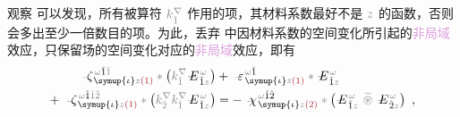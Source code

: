 观察  可以发现，所有被算符 $\mathcolor{gray}{k^\nabla_{\check{1}}}$ 作用的项，其材料系数最好不是 $\mathcolor{gray}{z}$ 的函数，否则会多出至少一倍数目的项。为此，丢弃  中因材料系数的空间变化所引起的\textcolor{Plum}{非局域}效应，只保留场的空间变化对应的\textcolor{Plum}{非局域}效应，即有
\begin{subequations}
	\abovedisplayskip=-8pt
\begin{align}
	\Xint{\begin{smallmatrix} ~ \\ {}^{}_{\mathcolor{gray}{-}} \\ ~ \end{smallmatrix}}{12}{\zeta}^{\;\! \mathcolor{gray}{\omega} \hat{1} \mathcolor{gray}{\check{1}}}_{\;\! \symup{\iota} \mathcolor{gray}{z} \textcolor{Maroon}{(1)}} \mathcolor{gray}{*} \left( \mathcolor{gray}{k^\nabla_{\check{1}}} \Xint{\mathcolor{gray}{-}}{295}{E}^{\;\!\mathcolor{gray}{\omega}}_{\;\! \hat{1} \mathcolor{gray}{z}} \right) &+ \Xint{\begin{smallmatrix} ~ \\ {}^{}_{\mathcolor{gray}{-}} \\ ~ \end{smallmatrix}}{16}{\varepsilon}^{\;\! \mathcolor{gray}{\omega} \hat{1}}_{\;\! \symup{\iota} \mathcolor{gray}{z} \textcolor{Maroon}{(1)}} \mathcolor{gray}{*} \Xint{\mathcolor{gray}{-}}{295}{E}^{\;\!\mathcolor{gray}{\omega}}_{\;\! \hat{1} \mathcolor{gray}{z}}  \label{eq:nonlinear(2)-wave_wkrho-simplify3} \\ 
	+~ \Xint{\begin{smallmatrix} ~ \\ {}^{}_{\mathcolor{gray}{-}} \\ ~ \end{smallmatrix}}{12}{\zeta}^{\;\! \mathcolor{gray}{\omega} \hat{1} \mathcolor{gray}{\check{1} \check{2}}}_{\;\! \symup{\iota} \mathcolor{gray}{z} \textcolor{Maroon}{(1)}} \mathcolor{gray}{*} \left( \mathcolor{gray}{k^\nabla_{\check{2}}} \mathcolor{gray}{k^\nabla_{\check{1}}} \Xint{\mathcolor{gray}{-}}{295}{E}^{\;\!\mathcolor{gray}{\omega}}_{\;\! \hat{1} \mathcolor{gray}{z}} \right) &= - ~\Xint{{}^{}_{\mathcolor{gray}{-}}}{23}{\chi}^{\;\! \mathcolor{gray}{\omega} \hat{1} \hat{2}}_{\;\! \symup{\iota} \mathcolor{gray}{z} \textcolor{Maroon}{(2)}} \mathcolor{gray}{*} \left( \Xint{\mathcolor{gray}{-}}{295}{E}^{\;\!\mathcolor{gray}{\omega}}_{\;\! \hat{1} \mathcolor{gray}{z}} ~\mathcolor{gray}{\widetilde \circledast}~ \Xint{\mathcolor{gray}{-}}{295}{E}^{\;\!\mathcolor{gray}{\omega}}_{\;\! \hat{2} \mathcolor{gray}{z}} \right)~, \label{eq:nonlinear(2)-wave_wkrho-simplify3-2}
\end{align}
\end{subequations}
